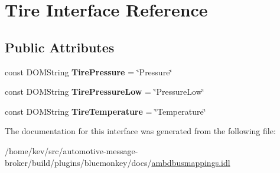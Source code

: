 \hypertarget{interfaceTire}{\section{Tire Interface Reference}
\label{interfaceTire}
}
\subsection*{Public Attributes}
\begin{DoxyCompactItemize}
\item 
\hypertarget{interfaceTire_ae9f48caaabe548696d27bc956b135e29}{const D\+O\+M\+String {\bfseries Tire\+Pressure} = \char`\"{}Pressure\char`\"{}}\label{interfaceTire_ae9f48caaabe548696d27bc956b135e29}

\item 
\hypertarget{interfaceTire_ac3e05d38925b7377fc2a15544cabed91}{const D\+O\+M\+String {\bfseries Tire\+Pressure\+Low} = \char`\"{}Pressure\+Low\char`\"{}}\label{interfaceTire_ac3e05d38925b7377fc2a15544cabed91}

\item 
\hypertarget{interfaceTire_ab20d18865a45ca32561df4783b15e787}{const D\+O\+M\+String {\bfseries Tire\+Temperature} = \char`\"{}Temperature\char`\"{}}\label{interfaceTire_ab20d18865a45ca32561df4783b15e787}

\end{DoxyCompactItemize}


The documentation for this interface was generated from the following file\+:\begin{DoxyCompactItemize}
\item 
/home/kev/src/automotive-\/message-\/broker/build/plugins/bluemonkey/docs/\hyperlink{ambdbusmappings_8idl}{ambdbusmappings.\+idl}\end{DoxyCompactItemize}
